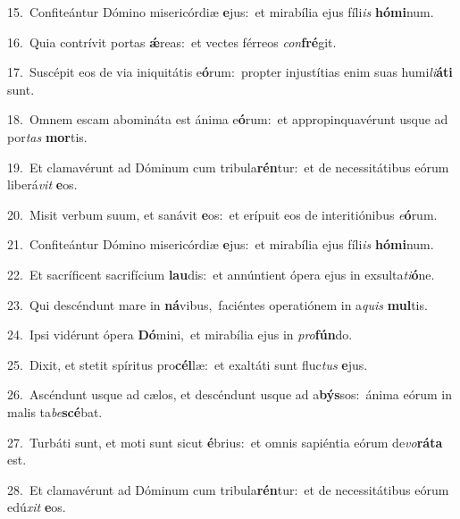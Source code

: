{\numbfont\textcolor{\numbcolor}{15.}}~Confiteántur Dómino misericórdiæ \textbf{e}\-jus:~\star et mirabília ejus fíli\textit{is} \textbf{hó}\-\textbf{mi}num.\par
{\numbfont\textcolor{\numbcolor}{16.}}~Quia contrívit portas \textbf{ǽ}\-reas:~\star et vectes férreos \textit{con}\-\textbf{fré}git.\par
{\numbfont\textcolor{\numbcolor}{17.}}~Suscépit eos de via iniquitátis e\-\textbf{ó}\-rum:~\star propter injustítias enim suas humi\-\textit{li}\-\textbf{á}\textbf{ti} sunt.\par
{\numbfont\textcolor{\numbcolor}{18.}}~Omnem escam abomináta est ánima e\-\textbf{ó}\-rum:~\star et appropinquavérunt usque ad por\textit{tas} \textbf{mor}\-tis.\par
{\numbfont\textcolor{\numbcolor}{19.}}~Et clamavérunt ad Dóminum cum tribula\-\textbf{rén}\-tur:~\star et de necessitátibus eórum liberá\textit{vit} \textbf{e}\-os.\par
{\numbfont\textcolor{\numbcolor}{20.}}~Misit verbum suum, et sanávit \textbf{e}\-os:~\star et erípuit eos de interitiónibus \textit{e}\-\textbf{ó}rum.\par
{\numbfont\textcolor{\numbcolor}{21.}}~Confiteántur Dómino misericórdiæ \textbf{e}\-jus:~\star et mirabília ejus fíli\textit{is} \textbf{hó}\-\textbf{mi}num.\par
{\numbfont\textcolor{\numbcolor}{22.}}~Et sacríficent sacrifícium \textbf{lau}\-dis:~\star et annúntient ópera ejus in exsulta\-\textit{ti}\-\textbf{ó}ne.\par
{\numbfont\textcolor{\numbcolor}{23.}}~Qui descéndunt mare in \textbf{ná}\-vibus,~\star faciéntes operatiónem in a\textit{quis} \textbf{mul}\-tis.\par
{\numbfont\textcolor{\numbcolor}{24.}}~Ipsi vidérunt ópera \textbf{Dó}\-mini,~\star et mirabília ejus in \textit{pro}\-\textbf{fún}do.\par
{\numbfont\textcolor{\numbcolor}{25.}}~Dixit, et stetit spíritus pro\-\textbf{cél}\-læ:~\star et exaltáti sunt fluc\textit{tus} \textbf{e}\-jus.\par
{\numbfont\textcolor{\numbcolor}{26.}}~Ascéndunt usque ad cælos, et descéndunt usque ad a\-\textbf{býs}\-sos:~\star ánima eórum in malis ta\-\textit{be}\-\textbf{scé}bat.\par
{\numbfont\textcolor{\numbcolor}{27.}}~Turbáti sunt, et moti sunt sicut \textbf{é}\-brius:~\star et omnis sapiéntia eórum de\-\textit{vo}\-\textbf{rá}\textbf{ta} est.\par
{\numbfont\textcolor{\numbcolor}{28.}}~Et clamavérunt ad Dóminum cum tribula\-\textbf{rén}\-tur:~\star et de necessitátibus eórum edú\textit{xit} \textbf{e}\-os.\par
